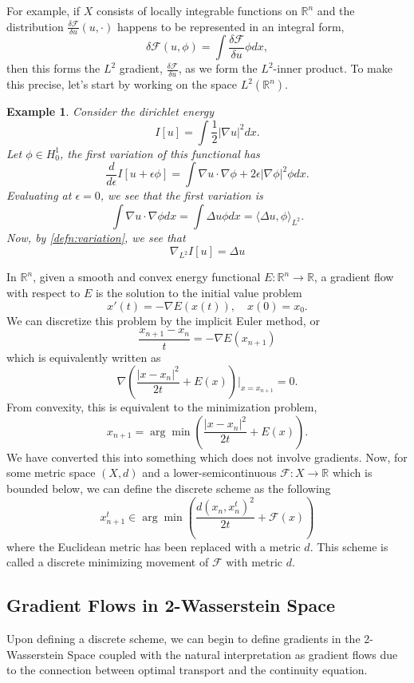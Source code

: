\documentclass[12pt]{article}
\newcommand{\R}{\mathbb{R}}
\theoremstyle{plain}
\newtheorem{exmp}{Example}[section]
\numberwithin{equation}{section}
\begin{document}
For example, if $X$ consists of locally integrable functions on $\R^n$ and the distribution $\frac{\delta \mathcal{F}}{\delta u}(u,\cdot)$ happens to be represented in an integral form,
\[\delta \mathcal{F}(u,\phi) = \int \frac{\delta \mathcal{F}}{\delta u}\phi dx,\]
then this forms the $L^2$ gradient, $\frac{\delta \mathcal{F}}{\delta u}$, as we form the $L^2$-inner product. To make this precise, let's start by working on the space $L^2(\R^n)$.
\begin{exmp}
  Consider the dirichlet energy 
  \[I[u] = \int \frac{1}{2}|\nabla u|^2dx.\]
  Let $\phi\in H^1_0$, the first variation of this functional has 
  \[\frac{d}{d\epsilon}I[u+\epsilon \phi] = \int \nabla u \cdot \nabla\phi + 2\epsilon|\nabla \phi|^2 \phi dx.\]
  Evaluating at $\epsilon = 0$, we see that the first variation is 
  \[ \int \nabla u \cdot \nabla\phi dx = \int \Delta u \phi dx = \langle \Delta u, \phi\rangle_{L^2}.\]
  Now, by \autoref{defn:variation}, we see that 
  \[\nabla_{L^2}I[u] = \Delta u\]
\end{exmp}
In $\R^n$, given a smooth and convex energy functional $E: \R^n\to \R$, a gradient flow with respect to $E$ is the solution to the initial value problem 
\[x'(t) = -\nabla E(x(t)),\quad x(0) = x_0.\]
We can discretize this problem by the implicit Euler method, or 
\[\frac{x_{n+1}-x_n}{t} = - \nabla E(x_{n+1})\]
which is equivalently written as
\[\nabla\left(\frac{|x-x_n|^2}{2t} + E(x)\right)\bigg\vert_{x=x_{n+1}} = 0.\]
From convexity, this is equivalent to the minimization problem,
\[x_{n+1} = \arg\min\left(\frac{|x-x_n|^2}{2t} + E(x)\right).\]
We have converted this into something which does not involve gradients. Now, for some metric space $(X,d)$ and a lower-semicontinuous $\mathcal{F}: X\to \R$ which is bounded below, we can define the discrete scheme as the following
\[x_{n+1}^t \in \arg\min\left(\frac{d(x_n,x_n^t)^2}{2t} + \mathcal{F}(x)\right)\]
where the Euclidean metric has been replaced with a metric $d$. This scheme is called a discrete minimizing movement of $\mathcal{F}$ with metric $d$.
\subsection{Gradient Flows in 2-Wasserstein Space}
Upon defining a discrete scheme, we can begin to define gradients in the 2-Wasserstein Space coupled with the natural interpretation as gradient flows due to the connection between optimal transport and the continuity equation.
\end{document}
